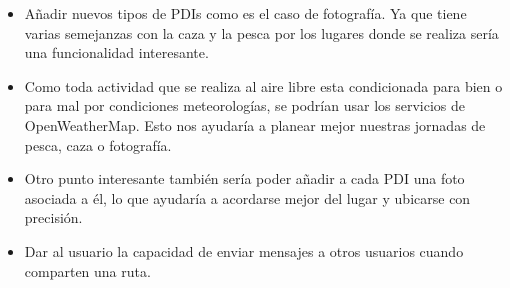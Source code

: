 \begin{itemize}
\item Añadir nuevos tipos de PDIs como es el caso de fotografía. Ya que tiene varias semejanzas con la caza y la pesca por los lugares donde se realiza sería una funcionalidad interesante.
\item Como toda actividad que se realiza al aire libre esta condicionada para bien o para mal por condiciones meteorologías, se podrían usar los servicios de OpenWeatherMap. Esto nos ayudaría a planear mejor nuestras jornadas de pesca, caza o fotografía.


\item Otro punto interesante también sería poder añadir a cada PDI una foto asociada a él, lo que ayudaría a acordarse mejor del lugar y ubicarse con precisión.

\item Dar al usuario la capacidad de enviar mensajes a otros usuarios cuando comparten una ruta.



\end{itemize}
